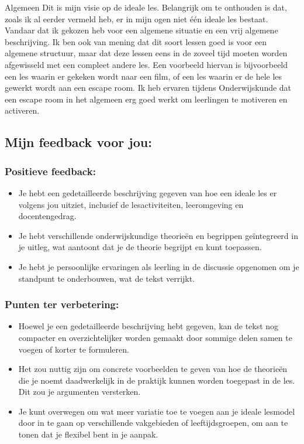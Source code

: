 \documentclass{article}
\begin{document}
{                Algemeen
                Dit is mijn visie op de ideale les. Belangrijk om te onthouden is dat, zoals ik al eerder vermeld heb, er in mijn ogen niet één ideale les bestaat. Vandaar dat ik gekozen heb voor een algemene situatie en een vrij algemene beschrijving. Ik ben ook van mening dat dit soort lessen goed is voor een algemene structuur, maar dat deze lessen eens in de zoveel tijd moeten worden afgewisseld met een compleet andere les. Een voorbeeld hiervan is bijvoorbeeld een les waarin er gekeken wordt naar een film, of een les waarin er de hele les gewerkt wordt aan een escape room. Ik heb ervaren tijdens Onderwijskunde dat een escape room in het algemeen erg goed werkt om leerlingen te motiveren en activeren.}

        \bigskip
            
        \subsection{Mijn feedback voor jou:}
            \subsubsection{Positieve feedback:}
                \begin{itemize}
                \item Je hebt een gedetailleerde beschrijving gegeven van hoe een ideale les er volgens jou uitziet, inclusief de lesactiviteiten, leeromgeving en docentengedrag.
                \item Je hebt verschillende onderwijskundige theorieën en begrippen geïntegreerd in je uitleg, wat aantoont dat je de theorie begrijpt en kunt toepassen.
                \item Je hebt je persoonlijke ervaringen als leerling in de discussie opgenomen om je standpunt te onderbouwen, wat de tekst verrijkt.
            \end{itemize}
            \subsubsection{Punten ter verbetering:}
            \begin{itemize}
                \item Hoewel je een gedetailleerde beschrijving hebt gegeven, kan de tekst nog compacter en overzichtelijker worden gemaakt door sommige delen samen te voegen of korter te formuleren.
                \item Het zou nuttig zijn om concrete voorbeelden te geven van hoe de theorieën die je noemt daadwerkelijk in de praktijk kunnen worden toegepast in de les. Dit zou je argumenten versterken.
                \item Je kunt overwegen om wat meer variatie toe te voegen aan je ideale lesmodel door in te gaan op verschillende vakgebieden of leeftijdsgroepen, om aan te tonen dat je flexibel bent in je aanpak.
            \end{itemize}
\end{document}
